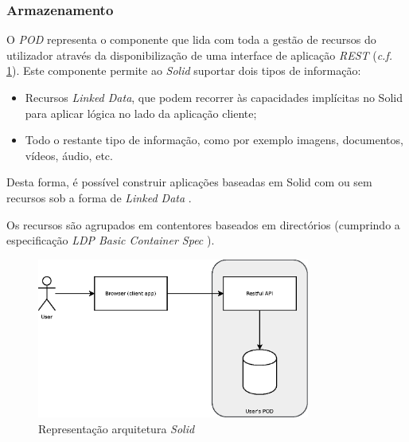 \subsubsection{Armazenamento \label{subsection_solid_armazenamento}}
O \emph{\acrshort{POD}} representa o componente que lida com toda a gestão de recursos do utilizador através da disponibilização de uma interface de aplicação \emph{\acrshort{REST}} (\emph{c.f.} \ref{estado_arte_representacao_solid}). Este componente permite ao \emph{Solid} suportar dois tipos de informação:
\begin{itemize}
    \item Recursos \emph{Linked Data}, que podem recorrer às capacidades implícitas no Solid para aplicar lógica no lado da aplicação cliente;
    \item Todo o restante tipo de informação, como por exemplo imagens, documentos, vídeos, áudio, etc.
\end{itemize}

Desta forma, é possível construir aplicações baseadas em Solid com ou sem recursos sob a forma de \emph{Linked Data} \cite{solid_spec}.

Os recursos são agrupados em contentores baseados em directórios (cumprindo a especificação \emph{\acrshort{LDP} Basic Container Spec} \cite{solid_spec}).

\begin{figure}[H]
    \begin{center}
    \includegraphics[width=0.8\textwidth]{figures/estado_arte-Solid.eps}
    \caption{Representação arquitetura \emph{Solid}}
    \label{estado_arte_representacao_solid}
    \end{center}
\end{figure}


